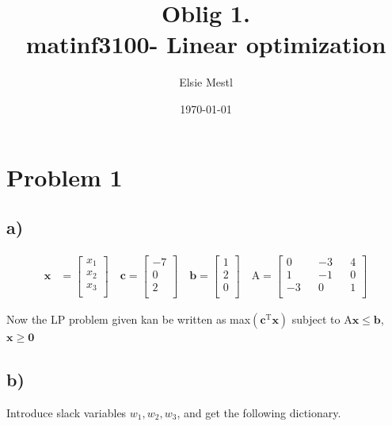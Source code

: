 \documentclass{article}
\author{Elsie Mestl}
\date{\today}
\title{Oblig 1. \\ matinf3100- Linear optimization}
\renewcommand{\vec}[1]{\mathbf{#1}}
\begin{document}
\maketitle


\section*{Problem 1}
\subsection*{a)}

\begin{align*}
  \vec{x} &=
  \begin{bmatrix}
    x_1 \\
    x_2 \\
    x_3 \\
  \end{bmatrix}
  \quad
  \vec{c} =
  \begin{bmatrix}
    -7 \\
    0 \\
    2 \\
  \end{bmatrix}
  \quad
  \vec{b} =
  \begin{bmatrix}
    1 \\
    2 \\
    0 \\
  \end{bmatrix} \quad
  \mathrm{A} =
  \begin{bmatrix}
    0 && -3 && 4 \\
    1 && -1 && 0 \\
    -3 && 0 && 1 \\
  \end{bmatrix}
\end{align*}

Now the LP problem given kan be written as max$(\vec{c}^\mathrm{T}\vec{x})$ subject to $\mathrm{A}\vec{x} \leq \vec{b}$, $\vec{x} \geq \vec{0}$


\subsection*{b)}
Introduce slack variables $w_1, w_2, w_3$, and get the following dictionary.
\end{document}
